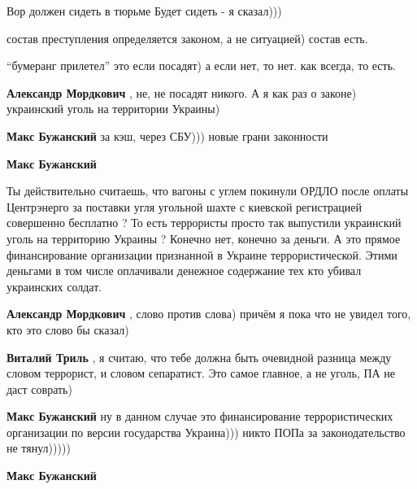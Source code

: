  
 
 
 
 
\zzSecCmt

\begin{itemize} %
Вор должен сидеть в тюрьме
Будет сидеть - я сказал)))

состав преступления определяется законом, а не ситуацией) состав есть.

\enquote{бумеранг прилетел} это если посадят) а если нет, то нет. как всегда, то есть.

\begin{itemize} %
\textbf{Александр Мордкович} , не, не посадят никого.
А я как раз о законе) украинский уголь на территории Украины)

\textbf{Макс Бужанский} за кэш, через СБУ))) новые грани законности

\textbf{Макс Бужанский} 

Ты действительно считаешь, что вагоны с углем покинули ОРДЛО после оплаты
Центрэнерго за поставки угля угольной шахте с киевской регистрацией совершенно
бесплатно ? То есть террористы просто так выпустили украинский уголь на
территорию Украины ? Конечно нет, конечно за деньги. А это прямое
финансирование организации признанной в Украине террористической. Этими
деньгами в том числе оплачивали денежное содержание тех кто убивал украинских
солдат.


\textbf{Александр Мордкович} , слово против слова) причём я пока что не увидел того, кто это слово бы сказал)

\textbf{Виталий Триль} , я считаю, что тебе должна быть очевидной разница между словом террорист, и словом сепаратист.
Это самое главное, а не уголь, ПА не даст соврать)

\textbf{Макс Бужанский} ну в данном случае это финансирование террористических организации по версии государства Украина)))
никто ПОПа за законодательство не тянул)))))

\textbf{Макс Бужанский} 


\end{itemize}
\end{itemize}
